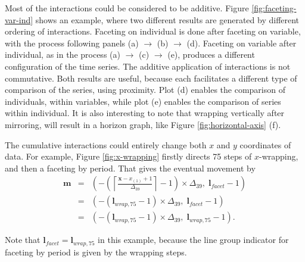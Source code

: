\documentclass[12pt]{article}
\begin{document}
Most of the interactions could be considered to be additive.
Figure \ref{fig:faceting-var-ind} shows an example, where two
different results are generated by different ordering of interactions.
Faceting on individual is done after faceting on variable, with the
process following panels (a) $\rightarrow$ (b) $\rightarrow$ (d).
Faceting on variable after individual, as in the process (a)
$\rightarrow$ (c) $\rightarrow$ (e), produces a different
configuration of the time series. The additive application of
interactions is not commutative. Both results are useful, because
each facilitates a different type of comparison of the series,
using proximity. Plot (d) enables the comparison of individuals,
within variables, while plot (e) enables the comparison of series
within individual. It is also interesting to
note that wrapping vertically after mirroring, will result in
a horizon graph, like Figure \ref{fig:horizontal-axis} (f).

The cumulative interactions could
entirely change both $x$ and $y$ coordinates of data.
For example, Figure \ref{fig:x-wrapping} firstly directs
75 steps of $x$-wrapping, and then a faceting by
period. That gives the eventual movement by
\begin{eqnarray*}
\mathbf{m} & = & (-\left(\left\lceil \frac{\mathbf{x}-x_{(1)}+1}{\Delta_{39}}\right\rceil -1\right)\times\Delta_{39}, \; \mathbf{l}{}_{facet}-1) \\
& = & (-(\mathbf{l}{}_{wrap,75} -1)\times\Delta_{39}, \; \mathbf{l}{}_{facet}-1) \\
& = & (-(\mathbf{l}{}_{wrap,75} -1)\times\Delta_{39}, \; \mathbf{l}{}_{wrap,75}-1).
\end{eqnarray*}

Note that $\mathbf{l}{}_{facet} = \mathbf{l}{}_{wrap,75}$
in this example, because the line group indicator for
faceting by period is given by the wrapping steps.
\end{document}
